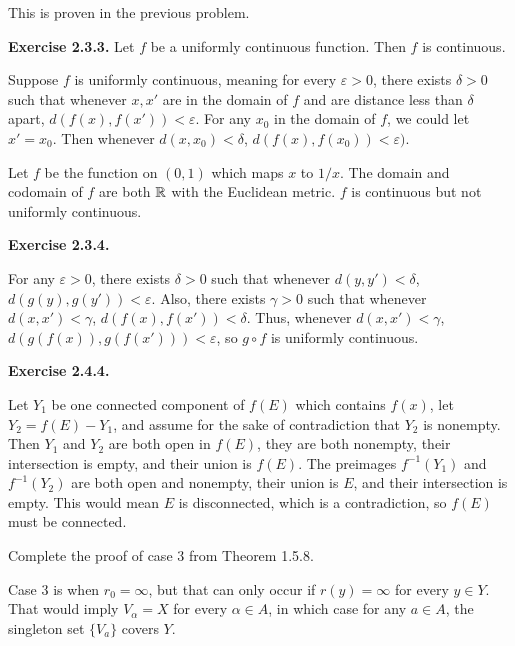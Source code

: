 \documentclass{article}
\begin{document}
\par
{} This is proven in the previous problem.
\par
{}
\par
{}
\par
{}
\bigskip
\par
\textbf{Exercise 2.3.3.} Let $f$ be a uniformly continuous function. Then $f$ is continuous.
\par
Suppose $f$ is uniformly continuous, meaning for every $\varepsilon > 0$, there exists $\delta > 0$ such that whenever $x, x'$ are in the domain of $f$ and are distance less than $\delta$ apart, $d(f(x), f(x')) < \varepsilon$. For any $x_0$ in the domain of $f$, we could let $x' = x_0$. Then whenever $d(x, x_0) < \delta$, $d(f(x), f(x_0)) < \varepsilon)$.
\par
Let $f$ be the function on $(0, 1)$ which maps $x$ to $1/x$. The domain and codomain of $f$ are both $\mathbb{R}$ with the Euclidean metric. $f$ is continuous but not uniformly continuous.
\par
\bigskip
\par
\textbf{Exercise 2.3.4.}
\par
For any $\varepsilon > 0$, there exists $\delta > 0$ such that whenever $d(y, y') < \delta$, $d(g(y), g(y')) < \varepsilon$. Also, there exists $\gamma > 0$ such that whenever $d(x, x') < \gamma$, $d(f(x), f(x')) < \delta$. Thus, whenever $d(x, x') < \gamma$, $d(g(f(x)), g(f(x'))) < \varepsilon$, so $g \circ f$ is uniformly continuous.
\bigskip
\par
\textbf{Exercise 2.4.4.}
\par
Let $Y_1$ be one connected component of $f(E)$ which contains $f(x)$, let $Y_2 = f(E) - Y_1$, and assume for the sake of contradiction that $Y_2$ is nonempty. Then $Y_1$ and $Y_2$ are both open in $f(E)$, they are both nonempty, their intersection is empty, and their union is $f(E)$. The preimages $f^{-1}(Y_1)$ and $f^{-1}(Y_2)$ are both open and nonempty, their union is $E$, and their intersection is empty. This would mean $E$ is disconnected, which is a contradiction, so $f(E)$ must be connected.

\bigskip
\begin{prob}
    Complete the proof of case 3 from Theorem 1.5.8.
\end{prob}
Case 3 is when $r_0=\infty$, but that can only occur if $r(y)=\infty$ for every $y \in Y$. That would imply $V_\alpha = X$ for every $\alpha \in A$, in which case for any $a \in A$, the singleton set $\{V_a\}$ covers $Y$.
\end{document}
